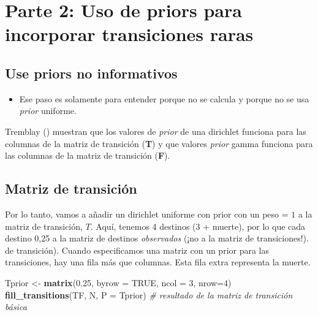 \documentclass[
]{book}
\newenvironment{Shaded}{\begin{snugshade}}{\end{snugshade}}
\newcommand{\AttributeTok}[1]{\textcolor[rgb]{0.13,0.29,0.53}{#1}}
\newcommand{\CommentTok}[1]{\textcolor[rgb]{0.56,0.35,0.01}{\textit{#1}}}
\newcommand{\ConstantTok}[1]{\textcolor[rgb]{0.56,0.35,0.01}{#1}}
\newcommand{\DecValTok}[1]{\textcolor[rgb]{0.00,0.00,0.81}{#1}}
\newcommand{\FloatTok}[1]{\textcolor[rgb]{0.00,0.00,0.81}{#1}}
\newcommand{\FunctionTok}[1]{\textcolor[rgb]{0.13,0.29,0.53}{\textbf{#1}}}
\newcommand{\NormalTok}[1]{#1}
\newcommand{\OtherTok}[1]{\textcolor[rgb]{0.56,0.35,0.01}{#1}}
\providecommand{\tightlist}{%
  \setlength{\itemsep}{0pt}\setlength{\parskip}{0pt}}
\theoremstyle{definition}
\theoremstyle{definition}
\theoremstyle{definition}
\theoremstyle{definition}
\theoremstyle{remark}
\begin{document}
\section{Parte 2: Uso de priors para incorporar transiciones raras}\label{parte-2-uso-de-priors-para-incorporar-transiciones-raras}

\subsection{Use priors no informativos}\label{use-priors-no-informativos}

\begin{itemize}
\tightlist
\item
  Ese paso es solamente para entender porque no se calcula y porque no
  se usa \emph{prior} uniforme.
\end{itemize}

Tremblay (\citet{tremblay2021population}) muestran que los valores de \emph{prior}
de una dirichlet funciona para las columnas de la matriz de transición
(\textbf{T}) y que valores \emph{prior} gamma funciona para las columnas de la
matriz de transición (\textbf{F}).

\subsection{Matriz de transición}\label{matriz-de-transiciuxf3n}

Por lo tanto, vamos a añadir un dirichlet uniforme con prior con un peso
= \(1\) a la matriz de transición, \(T\). Aquí, tenemos 4 destinos (3 +
muerte), por lo que cada destino 0,25 a la matriz de destinos
\emph{observados} (¡no a la matriz de transiciones!). de transición). Cuando
especificamos una matriz con un prior para las transiciones, hay una
fila más que columnas. Esta fila extra representa la muerte.

\begin{Shaded}
\begin{Highlighting}[]
\NormalTok{Tprior }\OtherTok{\textless{}{-}} \FunctionTok{matrix}\NormalTok{(}\FloatTok{0.25}\NormalTok{, }\AttributeTok{byrow =} \ConstantTok{TRUE}\NormalTok{, }\AttributeTok{ncol =} \DecValTok{3}\NormalTok{, }\AttributeTok{nrow=}\DecValTok{4}\NormalTok{)}
\FunctionTok{fill\_transitions}\NormalTok{(TF, N, }\AttributeTok{P =}\NormalTok{ Tprior) }\CommentTok{\# resultado de la matriz de transición básica}
\end{Highlighting}
\end{Shaded}
\end{document}
